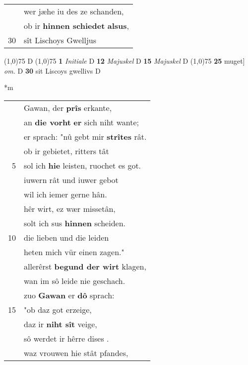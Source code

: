 \documentclass[8pt,a4paper,notitlepage]{article}
\begin{document}
\begin{table}[ht]
\begin{minipage}[t]{0.5\linewidth}
\begin{tabular}{rl}
 & wer jæhe iu des ze schanden,\\ 
 & ob ir \textbf{hinnen schiedet} \textbf{alsus},\\ 
30 & sît Lischoys Gwelljus\\ 
\end{tabular}
\scriptsize
\line(1,0){75} \newline
D \newline
\line(1,0){75} \newline
\textbf{1} \textit{Initiale} D  \textbf{12} \textit{Majuskel} D  \textbf{15} \textit{Majuskel} D  \newline
\line(1,0){75} \newline
\textbf{25} muget] \textit{om.} D \textbf{30} sit Liscoys gwellivs D \newline
\end{minipage}
\hspace{0.5cm}
\begin{minipage}[t]{0.5\linewidth}
\small
\begin{center}*m
\end{center}
\begin{tabular}{rl}
 & Gawan, der \textbf{prîs} erkante,\\ 
 & an \textbf{die vorht} \textbf{er} sich niht wante;\\ 
 & er sprach: "nû gebt mir \textbf{strîtes} rât.\\ 
 & ob ir gebietet, ritters tât\\ 
5 & sol ich \textbf{hie} leisten, ruochet es got.\\ 
 & iuwern rât und iuwer gebot\\ 
 & wil ich iemer gerne hân.\\ 
 & hêr wirt, ez wær missetân,\\ 
 & solt ich sus \textbf{hinnen} scheiden.\\ 
10 & die lieben und die leiden\\ 
 & heten mich vür einen zagen."\\ 
 & allerêrst \textbf{begund der wirt} klagen,\\ 
 & wan im sô leide nie geschach.\\ 
 & zuo \textbf{Gawan} er \textbf{dô} sprach:\\ 
15 & "ob daz got erzeige,\\ 
 & daz ir \textbf{niht sît} veige,\\ 
 & sô werdet ir hêrre dises .\\ 
 & waz vrouwen hie stât pfandes,\\ 

\end{tabular}
\end{minipage}
\end{table}
\end{document}

